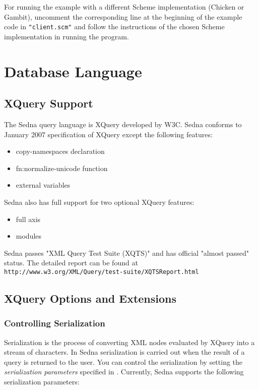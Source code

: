 \documentclass[a4paper,12pt]{article}
\begin{document}
For running the example with a different Scheme implementation (Chicken or
Gambit), uncomment the corresponding line at the beginning of the example code
in \texttt{"client.scm"} and follow the instructions of the chosen Scheme
implementation in running the program.

%
%
\section{Database Language}
\label{sec:DBLang}

\subsection{XQuery Support}
\label{sec:xquery-support}
The Sedna query language is XQuery \cite{paper:query-language} developed by W3C.
Sedna conforms to January 2007 specification of XQuery except the following features:
\begin{itemize}
\item copy-namespaces declaration
\item fn:normalize-unicode function
\item external variables
\end{itemize}
Sedna also has full support for two optional XQuery features:
\begin{itemize}
\item full axis
\item modules
\end{itemize}

Sedna passes "XML Query Test Suite (XQTS)" and has official "almost passed" status. The detailed report can be found at \verb!http://www.w3.org/XML/Query/test-suite/XQTSReport.html!

\subsection{XQuery Options and Extensions}
\label{sec:xquery-extensions}

\subsubsection{Controlling Serialization}
\label{indents}
Serialization is the process of converting XML nodes evaluated by XQuery into a stream of characters. In Sedna serialization is carried out when the result of a query is returned to the user. You can control the serialization by setting the \emph{serialization parameters} specified in \cite{paper:query-serialization}. Currently, Sedna supports the following serialization parameters:
\end{document}
